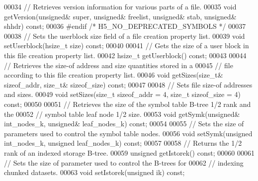 \begin{DoxyCode}
00034         \textcolor{comment}{// Retrieves version information for various parts of a file.}
00035         \textcolor{keywordtype}{void} getVersion(\textcolor{keywordtype}{unsigned}& super, \textcolor{keywordtype}{unsigned}& freelist, \textcolor{keywordtype}{unsigned}& stab, \textcolor{keywordtype}{unsigned}& shhdr) \textcolor{keyword}{const};
00036 \textcolor{preprocessor}{#endif }\textcolor{comment}{/* H5\_NO\_DEPRECATED\_SYMBOLS */}\textcolor{preprocessor}{}
00037 
00038         \textcolor{comment}{// Sets the userblock size field of a file creation property list.}
00039         \textcolor{keywordtype}{void} setUserblock(hsize\_t size) \textcolor{keyword}{const};
00040 
00041         \textcolor{comment}{// Gets the size of a user block in this file creation property list.}
00042         hsize\_t getUserblock() \textcolor{keyword}{const};
00043 
00044         \textcolor{comment}{// Retrieves the size-of address and size quantities stored in a}
00045         \textcolor{comment}{// file according to this file creation property list.}
00046         \textcolor{keywordtype}{void} getSizes(\textcolor{keywordtype}{size\_t}& sizeof\_addr, \textcolor{keywordtype}{size\_t}& sizeof\_size) \textcolor{keyword}{const};
00047 
00048         \textcolor{comment}{// Sets file size-of addresses and sizes.}
00049         \textcolor{keywordtype}{void} setSizes(\textcolor{keywordtype}{size\_t} sizeof\_addr = 4, \textcolor{keywordtype}{size\_t} sizeof\_size = 4) \textcolor{keyword}{const};
00050 
00051         \textcolor{comment}{// Retrieves the size of the symbol table B-tree 1/2 rank and the}
00052         \textcolor{comment}{// symbol table leaf node 1/2 size.}
00053         \textcolor{keywordtype}{void} getSymk(\textcolor{keywordtype}{unsigned}& int\_nodes\_k, \textcolor{keywordtype}{unsigned}& leaf\_nodes\_k) \textcolor{keyword}{const};
00054 
00055         \textcolor{comment}{// Sets the size of parameters used to control the symbol table nodes.}
00056         \textcolor{keywordtype}{void} setSymk(\textcolor{keywordtype}{unsigned} int\_nodes\_k, \textcolor{keywordtype}{unsigned} leaf\_nodes\_k) \textcolor{keyword}{const};
00057 
00058         \textcolor{comment}{// Returns the 1/2 rank of an indexed storage B-tree.}
00059         \textcolor{keywordtype}{unsigned} getIstorek() \textcolor{keyword}{const};
00060 
00061         \textcolor{comment}{// Sets the size of parameter used to control the B-trees for}
00062         \textcolor{comment}{// indexing chunked datasets.}
00063         \textcolor{keywordtype}{void} setIstorek(\textcolor{keywordtype}{unsigned} ik) \textcolor{keyword}{const};

\end{DoxyCode}
